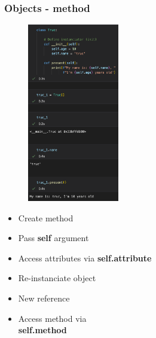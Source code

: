\begin{frame}\frametitle{Objects - method}
   \begin{minipage}{0.4\linewidth}
      \begin{figure}[H]
         \includegraphics[width=4cm]{../images/illustrations/object_method.png}
      \end{figure}
   \end{minipage}
   \begin{minipage}{0.58\linewidth}
      \begin{itemize}
         \item Create method
         \item Pass \textbf{self} argument
         \item Access attributes via \textbf{self.attribute}
         \item Re-instanciate object 
         \item New reference
         \item Access method via\\\textbf{self.method}
      \end{itemize}
   \end{minipage}
\end{frame}


